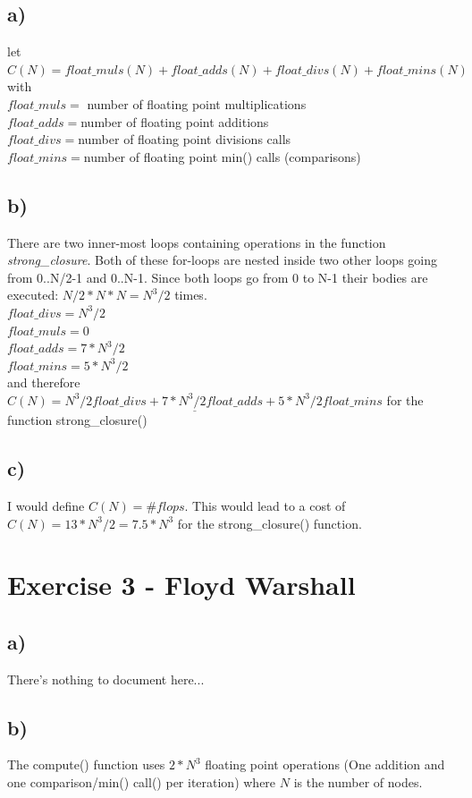 \documentclass[10pt,a4paper,oneside,notitlepage]{report}
\begin{document}
\subsection*{a)}
let $C(N) = float\_muls(N) + float\_adds (N) + float\_divs(N) + float\_mins(N)$ \\ with \\
$float\_muls = $ number of floating point multiplications \\
$float\_adds = $number of floating point additions \\
$float\_divs = $number of floating point divisions calls \\
$float\_mins = $number of floating point min() calls (comparisons) \\

\subsection*{b)}
There are two inner-most loops containing operations in the function \textit{strong\_closure}. Both of these for-loops are nested inside two other loops going from 0..N/2-1 and 0..N-1. Since both loops go from 0 to N-1 their bodies are executed: $N/2 * N * N = N^3/2$ times.
\\
$float\_divs = N^3/2$ \\
$float\_muls = 0$ \\
$float\_adds = 7*N^3/2$ \\
$float\_mins = 5*N^3/2$\\
and therefore $\underline{C(N) = N^3/2 float\_divs + 7*N^3/2 float\_adds + 5*N^3/2 float\_mins}$ for the function strong\_closure()

\subsection*{c)}
I would define $C(N) = {\#flops}$. This would lead to a cost of $C(N) = 13*N^3/2 = 7.5*N^3$ for the strong\_closure() function.

\section*{Exercise 3 - Floyd Warshall}
\subsection*{a)}
There's nothing to document here...
\subsection*{b)}
The compute() function uses $2*N^3$ floating point operations (One addition and one comparison/min() call() per iteration) where $N$ is the number of nodes.
\end{document}
